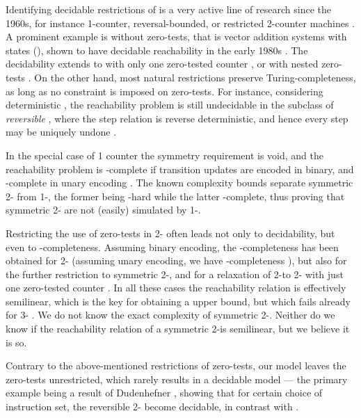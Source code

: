 
Identifying decidable restrictions of 
is a very active line of research since the 1960s, for instance 
1-counter, reversal-bounded, or restricted 2-counter machines 
\cite{HKOW09,Ibarra78,FS00}.
A prominent example is  without zero-tests, that is
vector addition systems with states
(\vass), shown to have decidable reachability in the early 1980s
\cite{Mayr81,Kosaraju82,Lambert92}.
The decidability extends to 
with only one zero-tested counter \cite{Bonnet11},
or with nested zero-tests \cite{Reinhardt08,GCL25}.
On the other hand, most natural restrictions
preserve Turing-completeness, as long as no constraint is imposed
on zero-tests.
For instance, considering deterministic , 
the reachability problem is still undecidable
in the subclass of \emph{reversible} ,
where the step relation is reverse deterministic, and hence every step
may be uniquely undone \cite{Morita96}.

In the special case of 1 counter the symmetry requirement is void,
and the reachability problem is \np-complete 
if transition updates are encoded in binary, and \nl-complete 
in unary encoding \cite{HKOW09}.
The known complexity bounds separate symmetric 2- from 1-, 
the former being \pspace-hard while the latter \np-complete,
thus proving that symmetric 2- are not (easily) simulated
by 1-.

Restricting the use of zero-tests in 2- often
leads not only to decidability, but even 
to \pspace-completeness.
Assuming binary encoding,
the \pspace-completeness has been obtained for 2-\vass 
\cite{Blondin15,BEFGHLMT21}
(assuming unary encoding, we have \nl-completeness \cite{ELT16}),
but also for the further restriction to symmetric 2-\vass \cite{KL25},
and for a relaxation of 2-\vass to 
2- with just one zero-tested counter \cite{FLS18}.
In all these cases 
the reachability relation is effectively semilinear, which
is the key for obtaining a \pspace upper bound, but which 
fails already for 3-\vass 
\cite{HopcroftPansiot}.
We do not know the exact complexity of symmetric 2-.
Neither do we know if the reachability relation of a
symmetric 2-\cm is semilinear, but we believe it is so.

Contrary to the above-mentioned restrictions of zero-tests, 
our model leaves the zero-tests unrestricted,
which rarely results in a decidable model
--- the primary example being a result of Dudenhefner
\cite{Dudenhefner22}, showing that
for certain 
choice of instruction set, the reversible 2-
become decidable, in contrast with \cite{Morita96}.
% 



